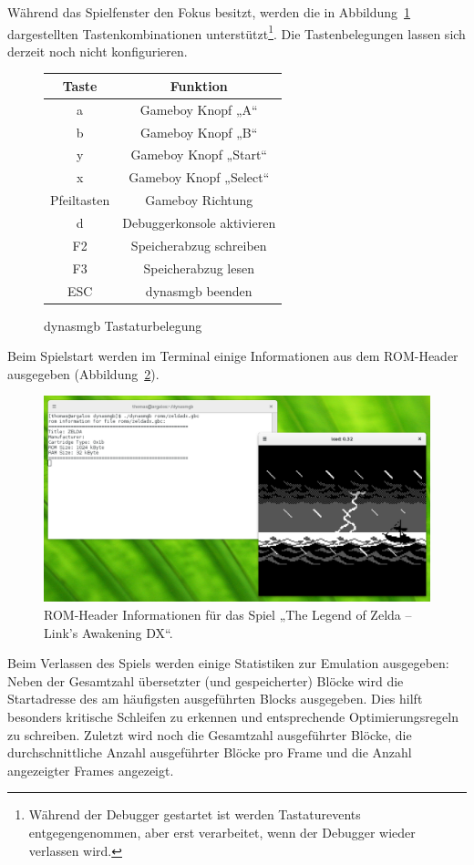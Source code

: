 \documentclass[a4paper]{scrartcl}
\begin{document}
Während das Spielfenster den Fokus besitzt, werden die in Abbildung~\ref{tab:keys} dargestellten Tastenkombinationen unterstützt\footnote{Während der Debugger gestartet ist werden Tastaturevents entgegengenommen, aber erst verarbeitet, wenn der Debugger wieder verlassen wird.}. Die Tastenbelegungen lassen sich derzeit noch nicht konfigurieren.

\begin{figure}[htbp]
\centering
\begin{tabular}{c|c}
Taste&Funktion \\
\hline
a&Gameboy Knopf „A“ \\
b&Gameboy Knopf „B“ \\
y&Gameboy Knopf „Start“ \\
x&Gameboy Knopf „Select“ \\
Pfeiltasten&Gameboy Richtung \\
d&Debuggerkonsole aktivieren \\
F2&Speicherabzug schreiben \\
F3&Speicherabzug lesen \\
ESC&dynasmgb beenden
\end{tabular}
\caption{dynasmgb Tastaturbelegung}
\label{tab:keys}
\end{figure}

Beim Spielstart werden im Terminal einige Informationen aus dem ROM-Header ausgegeben (Abbildung~\ref{img:zelda_start}).

\begin{figure}[htbp]
\centering
\includegraphics[width=\linewidth]{img/zelda_start}
\caption{ROM-Header Informationen für das Spiel „The Legend of Zelda -- Link's Awakening DX“.}
\label{img:zelda_start}
\end{figure}

Beim Verlassen des Spiels werden einige Statistiken zur Emulation ausgegeben: Neben der Gesamtzahl übersetzter (und gespeicherter) Blöcke wird die Startadresse des am häufigsten ausgeführten Blocks ausgegeben. Dies hilft besonders kritische Schleifen zu erkennen und entsprechende Optimierungsregeln zu schreiben. Zuletzt wird noch die Gesamtzahl ausgeführter Blöcke, die durchschnittliche Anzahl ausgeführter Blöcke pro Frame und die Anzahl angezeigter Frames angezeigt.
\end{document}
